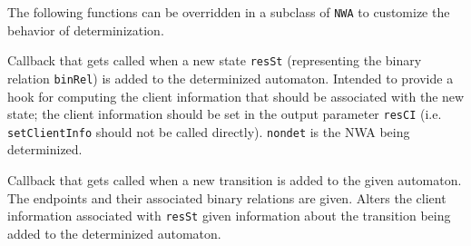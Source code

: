 The following functions can be overridden in a subclass of \texttt{NWA} to
customize the behavior of determinization.

\begin{functionlist}
  Callback that gets called when a new state \texttt{resSt} (representing the
  binary relation \texttt{binRel}) is added to the determinized automaton.
  Intended to provide a hook for computing the client information that should
  be associated with the new state; the client information should be set in
  the output parameter \texttt{resCI} (i.e. \texttt{setClientInfo} should not
  be called directly). \texttt{nondet} is the NWA being determinized.

   \nopagebreak
    Callback that gets called when a new transition is added to the given
    automaton. The endpoints and their associated binary relations are
    given.
    Alters the client information associated with \texttt{resSt} given
    information about the transition being added to the determinized
    automaton.
 \end{functionlist}


